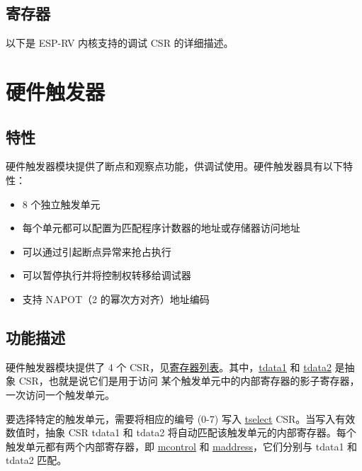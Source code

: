\documentclass[main\_\_CN.tex]{subfiles}
\begin{document}


\subsection{寄存器}
以下是 ESP-RV 内核支持的调试 CSR 的详细描述。




\clearpage
\section{硬件触发器}
\label{sec:riscvcpu-hwt}

\subsection{特性}
\label{sec:riscvcpu-hwt-features}

硬件触发器模块提供了断点和观察点功能，供调试使用。硬件触发器具有以下特性：

\begin{itemize}
    \item 8 个独立触发单元
    \item 每个单元都可以配置为匹配程序计数器的地址或存储器访问地址
    \item 可以通过引起断点异常来抢占执行
    \item 可以暂停执行并将控制权转移给调试器
    \item 支持 NAPOT（2 的幂次方对齐）地址编码
\end{itemize}

\subsection{功能描述}
\label{sec:riscvcpu-hwt-func-descr}

硬件触发器模块提供了 4 个 CSR，见\hyperref[sec:riscvcpu-hwt-reg-summ]{寄存器列表}。其中，\hyperref[regdesc:TDATA1]{tdata1} 和 \hyperref[regdesc:TDATA2]{tdata2} 是抽象 CSR，也就是说它们是用于访问 某个触发单元中的内部寄存器的影子寄存器，一次访问一个触发单元。

要选择特定的触发单元，需要将相应的编号 (0-7) 写入 \hyperref[regdesc:TSELECT]{tselect} CSR。当写入有效数值时，抽象 CSR tdata1 和 tdata2 将自动匹配该触发单元的内部寄存器。每个触发单元都有两个内部寄存器，即 \hyperref[regdesc:MCONTROL]{mcontrol} 和 \hyperref[regdesc:MADDRESS]{maddress}，它们分别与 tdata1 和 tdata2 匹配。
\end{document}
